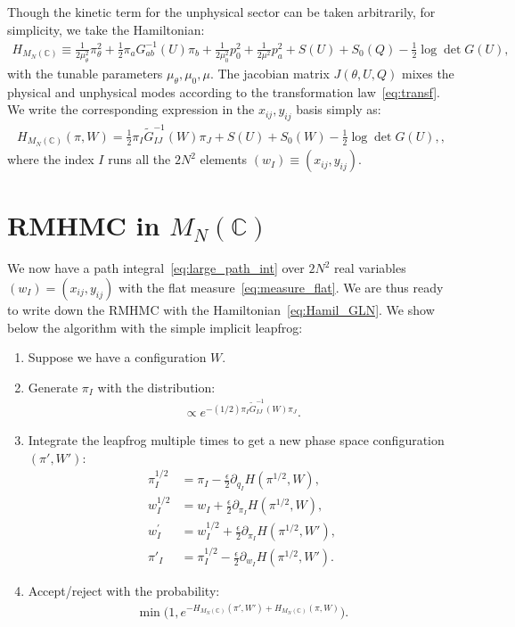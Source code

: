 \documentclass[12pt]{article}
\begin{document}
Though the kinetic term for the unphysical sector
can be taken arbitrarily,
for simplicity, we take the Hamiltonian:
\begin{align}
  H_{M_N(\mathbb{C})}
  \equiv
  \frac{1}{2 \mu_\theta^2}
  \pi_\theta^2
  +
  \frac{1}{2}
  \pi_a G^{-1}_{ab} (U) \pi_b
  +
  \frac{1}{2 \mu_0^2}
  p_0^2
  +
  \frac{1}{2 \mu^2}
  p_a^2
  +
  S(U)
  +
  S_0(Q)
  - \frac{1}{2} \log \det G(U),
\end{align}
with the tunable parameters $\mu_\theta, \mu_0, \mu$.
The jacobian matrix $J(\theta, U, Q)$ mixes the
physical and unphysical modes according to
the transformation law~\eqref{eq:transf}.
We write the corresponding expression in the $x_{ij}, y_{ij}$
basis simply as:
\begin{align}
  H_{M_N(\mathbb{C})}
  (\pi, W)
  =
  \frac{1}{2} \pi_I \tilde{G}_{IJ}^{-1}(W) \pi_J + S(U) + S_0(W)
  - \frac{1}{2} \log \det G(U),,
  \label{eq:Hamil_GLN}
\end{align}
where the index $I$ runs all the $2N^2$ elements
$(w_I) \equiv ( x_{ij}, y_{ij} )$.


\section{RMHMC in $M_N(\mathbb{C})$}
\label{sec:rmhmc_gln}

We now have
a path integral~\eqref{eq:large_path_int}
over $2N^2$ real variables
$(w_I) = (x_{ij}, y_{ij})$
with the flat measure~\eqref{eq:measure_flat}.
We are thus ready to write down the
RMHMC with the Hamiltonian~\eqref{eq:Hamil_GLN}.
We show below the algorithm with the simple implicit leapfrog:
\begin{enumerate}
\item Suppose we have a configuration $W$.
\item Generate $\pi_I$
  with the distribution:
  \begin{align}
    \propto e^{-(1/2) \pi_I \tilde G_{IJ}^{-1}(W) \pi_J}.
  \end{align}
\item
  Integrate the leapfrog
  multiple times to get a new phase space configuration $(\pi',W')$:
  \begin{align}
    \pi_I^{1/2}
    &=
      \pi_I
      -
      \frac{\epsilon}{2}
      \partial_{q_I} H(\pi^{1/2}, W)
      ,
      \label{eq:p_half}
    \\
    w_I^{1/2}
    &=
      w_I
      +
      \frac{\epsilon}{2}
      \partial_{\pi_I} H(\pi^{1/2}, W)
      ,
      \label{eq:q_half}
    \\
    w_I^{\prime}
    &=
      w_I^{1/2}
      +
      \frac{\epsilon}{2}
      \partial_{\pi_I} H(\pi^{1/2}, W')
      ,
      \label{eq:q_prime}
    \\
    \pi'_I
    &= \pi_I^{1/2}
      -
      \frac{\epsilon}{2}
      \partial_{w_I} H(\pi^{1/2}, W').
      \label{eq:p_prime}
  \end{align}
\item Accept/reject with the probability:
  \begin{align}
    \min \Big(
    1, e^{-H_{M_N(\mathbb{C})}(\pi',W') + H_{M_N(\mathbb{C})}(\pi, W)}
    \Big).
  \end{align}
\end{enumerate}
\end{document}
